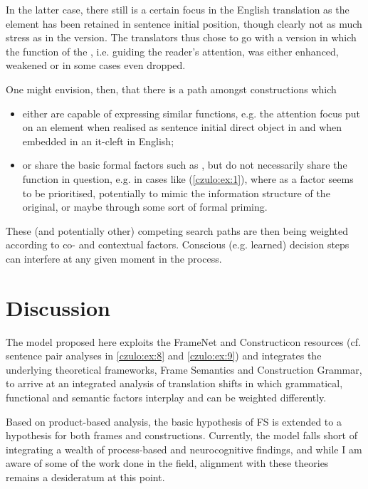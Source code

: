 \documentclass[output=paper]{LSP/langsci}
\begin{document}
In the latter case, there still is a certain focus in the English translation as the element has been retained in sentence initial position, though clearly not as much stress as in the  version. The translators thus chose to go with a version in which the function of the , i.e. guiding the reader's attention, was either enhanced, weakened or in some cases even dropped.

One might envision, then, that there is a  path amongst constructions which 

\begin{itemize}
\item either are capable of expressing similar functions, e.g. the attention focus put on an element when realised as sentence initial direct object in  and when embedded in an it-cleft in English;
\item or share the basic formal factors such as , but do not necessarily share the function in question, e.g. in cases like (\ref{czulo:ex:1}), where  as a factor seems to be prioritised, potentially to mimic the information structure of the original, or maybe through some sort of formal priming.
\end{itemize}

These (and potentially other) competing search paths are then being weighted according to co- and contextual factors. Conscious (e.g. learned) decision steps can interfere at any given moment in the process.

\section{Discussion}\label{czulo:sec:5}
\largerpage[2]
The model proposed here exploits the FrameNet and Constructicon resources (cf. sentence pair analyses in \ref{czulo:ex:8} and \ref{czulo:ex:9}) and integrates the underlying theoretical frameworks, Frame Semantics and Construction Grammar, to arrive at an integrated analysis of translation shifts in which grammatical, functional and semantic factors interplay and can be weighted differently.

Based on product-based analysis, the basic  hypothesis of FS is extended to a  hypothesis for both frames and constructions. Currently, the model falls short of integrating a wealth of process-based and neurocognitive findings, and while I am aware of some of the work done in the field, alignment with these theories remains a desideratum at this point.
\end{document}
